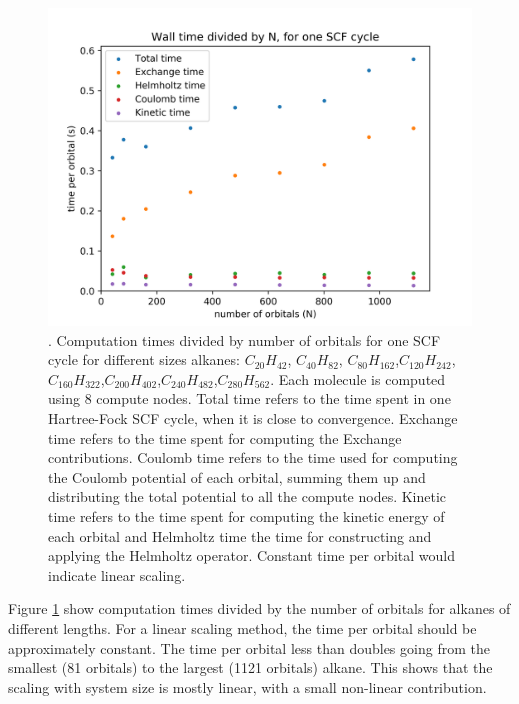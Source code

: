 \documentclass[%
 aip,
 amsmath,amssymb,
 reprint,%
]{revtex4-1}
\begin{document}
\begin{figure}
\centering
\includegraphics[width=1.\textwidth]{Times_nAlkanes.png}
\caption{\label{fig01}. Computation times divided by number of orbitals for one SCF cycle for different sizes alkanes: $C_{20}H_{42}$, $C_{40}H_{82}$, $C_{80}H_{162}$,$ C_{120}H_{242}$,$ C_{160}H_{322}$,$ C_{200}H_{402}$,$ C_{240}H_{482}$,$ C_{280}H_{562}$. Each molecule is computed using 8 compute nodes. Total time refers to the time spent in one Hartree-Fock SCF cycle, when it is close to convergence. Exchange time refers to the time spent for computing the Exchange contributions. Coulomb time refers to the time used for computing the Coulomb potential of each orbital, summing them up and distributing the total potential to all the compute nodes. Kinetic time refers to the time spent for computing the kinetic energy of each orbital  and Helmholtz time the time for constructing and applying the Helmholtz operator. Constant time per orbital would indicate linear scaling.}
\end{figure}

Figure \ref{fig01} show computation times divided by the number of orbitals for alkanes of different lengths. For a linear scaling method, the time per orbital should be approximately constant.  The time per orbital less than doubles going from the smallest (81 orbitals) to the largest (1121 orbitals) alkane. This shows that the scaling with system size is mostly linear, with a small non-linear contribution.  

\end{document}
